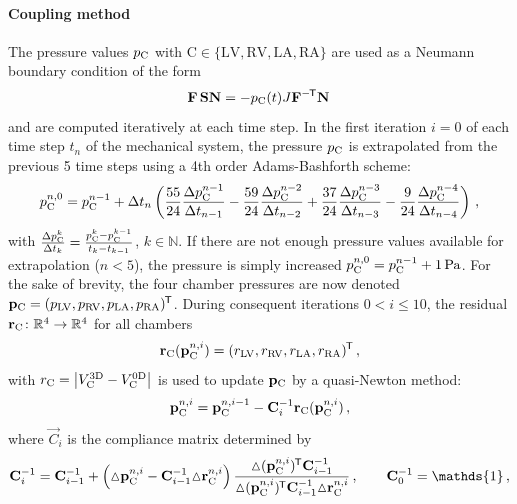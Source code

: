 \paragraph{Coupling method} The pressure values $p_\mathrm{C}$ with $\mathrm{C} \in \{\mathrm{LV,RV,LA,RA}\}$ are used as a Neumann boundary condition of the form
\begin{equation}
    \F\,\S \vec N = -\p{C}(t) J \vec F^{-\tran} \vec N \,
\end{equation}
and are computed iteratively at each time step.
In the first iteration $i=0$ of each time step $t_n$ of the mechanical system, the pressure $p_\mathrm{C}$ is extrapolated from the previous 5 time steps using a 4th order Adams-Bashforth scheme:
\begin{equation} 
    \label{eq:circextrapolation}
    p_\mathrm{C}^{n,0} = p_\mathrm{C}^{n-1} + \Delta t_n\left(
    \frac{55}{24}\frac{\Delta p_\mathrm{C}^{n-1}}{\Delta t_{n-1}}
    - \frac{59}{24}\frac{\Delta p_\mathrm{C}^{n-2}}{\Delta t_{n-2}}
    + \frac{37}{24}\frac{\Delta p_\mathrm{C}^{n-3}}{\Delta t_{n-3}}
    - \frac{9}{24}\frac{\Delta p_\mathrm{C}^{n-4}}{\Delta t_{n-4}}
    \right)\,,
\end{equation}
with $\frac{\Delta p_\mathrm{C}^k}{\Delta t_{k}} = \frac{p_\mathrm{C}^k - p_\mathrm{C}^{k-1}}{t_{k}- t_{k-1}}$, $k\in\mathbb{N}$.
If there are not enough pressure values available for extrapolation (\ie $n<5$), the pressure is simply increased $p_\mathrm{C}^{n,0} = p_\mathrm{C}^{n-1} + \SI{1}{\pascal}$.
For the sake of brevity, the four chamber pressures are now denoted $\vp{C} = (\p{LV}, \p{RV}, \p{LA}, \p{RA})^\tran$.
During consequent iterations $0 < i \leq 10$, the residual $\res{C}\colon\mathbb{R}^{4}\rightarrow\mathbb{R}^{4}$ for all chambers 
\begin{equation*}
    \res{C}(\vp{C}^{n,i})= (r_\mathrm{LV},r_\mathrm{RV},r_\mathrm{LA},r_\mathrm{RA})^\tran \,,
\end{equation*}
with $r_\mathrm{C} = \abs{V_\mathrm{C}^\mathrm{3D} - V_\mathrm{C}^\mathrm{0D}}$ is used to update $\vp{C}$ by a quasi-Newton method:
\begin{equation}
    \label{eq:quadinewton}
\vp{C}^{n,i} = \vp{C}^{n,i-1} - \vec C_i^{-1}\res{C}(\vp{C}^{n,i}) \,,
\end{equation}
where $\vec C_i$ is the compliance matrix determined by
\begin{equation*}
\vec C_i^{-1} = \vec C_{i-1}^{-1} + \left({\vartriangle} \vp{C}^{n,i}-\vec C_{i-1}^{-1}
{\vartriangle} \res{C}^{n,i}\right) \frac{{\vartriangle} (\vp{C}^{n,i})^\tran\vec C_{i-1}^{-1}}{{\vartriangle} (\vp{C}^{n,i})^\tran\vec C_{i-1}^{-1}{\vartriangle} \res{C}^{n,i}}\,,\qquad \vec C_0^{-1} = \mathds{1} \,,
\end{equation*} 
